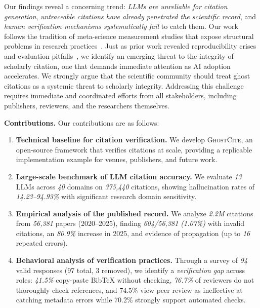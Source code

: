 Our findings reveal a concerning trend: \textit{LLMs are unreliable for citation generation}, \textit{untraceable citations have already penetrated the scientific record}, and \textit{human verification mechanisms systematically fail} to catch them.
Our work follows the tradition of meta-science measurement studies that expose structural problems in research practices~\cite{baker2016reproducibility,ioannidis2005most,rossow2012prudent,schloegel2025confusing}.
Just as prior work revealed reproducibility crises and evaluation pitfalls~\cite{baker2016reproducibility,rossow2012prudent}, we identify an emerging threat to the integrity of scholarly citation, one that demands immediate attention as AI adoption accelerates. 
We strongly argue that the scientific community should treat ghost citations as a systemic threat to scholarly integrity. Addressing this challenge requires immediate and coordinated efforts from all stakeholders, including publishers, reviewers, and the researchers themselves.

\textbf{Contributions.}
Our contributions are as follows:

\begin{enumerate}
    \item \textbf{Technical baseline for citation verification.} We develop \textsc{GhostCite}, an open-source framework that verifies citations at scale, providing a replicable implementation example for venues, publishers, and future work.

    \item \textbf{Large-scale benchmark of LLM citation accuracy.} We evaluate \textit{13} LLMs across \textit{40} domains on \textit{375,440} citations, showing hallucination rates of \textit{14.23--94.93\%} with significant research domain sensitivity.
    
    \item \textbf{Empirical analysis of the published record.} We analyze \textit{2.2M} citations from \textit{56,381} papers (2020--2025), finding \textit{604/56,381 (1.07\%)} with invalid citations, an \textit{80.9\%} increase in 2025, and evidence of propagation (up to \textit{16} repeated errors).
    
    \item \textbf{Behavioral analysis of verification practices.} Through a survey of \textit{94} valid responses (97 total, 3 removed), we identify a \textit{verification gap} across roles: \textit{41.5\%} copy-paste BibTeX without checking, \textit{76.7\%} of reviewers do not thoroughly check references, and 74.5\% view peer review as ineffective at catching metadata errors while 70.2\% strongly support automated checks.
 
\end{enumerate}


